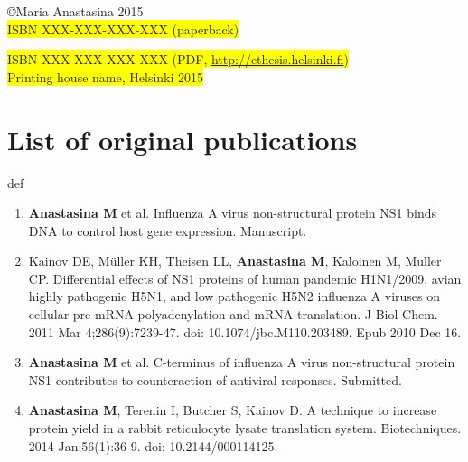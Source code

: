 \documentclass[a4paper,12pt]{article} %
\providecommand{\phantomsection}{def} %
\begin{document}
\vspace{2 cm}

\copyright Maria Anastasina 2015 \\


\fboxsep=0pt\colorbox{yellow}{ISBN XXX-XXX-XXX-XXX (paperback)}

\fboxsep=0pt\colorbox{yellow}{ISBN XXX-XXX-XXX-XXX (PDF, \url{http://ethesis.helsinki.fi})}\\

\fboxsep=0pt\colorbox{yellow}{Printing house name, Helsinki 2015}


\newpage
\thispagestyle{empty}
\tableofcontents


\newpage
\thispagestyle{empty}
\section*{List of original publications}
\phantomsection %

	\begin{enumerate}[I]

	\item \textbf{Anastasina M} et al. Influenza A virus non-structural protein NS1 binds DNA to control host gene expression. Manuscript. \label{DNA}
	
	\item 	Kainov DE, Müller KH, Theisen LL, \textbf{Anastasina M}, Kaloinen M, Muller CP. Differential effects of NS1 proteins of human pandemic H1N1/2009, avian highly pathogenic H5N1, and low pathogenic H5N2 influenza A viruses on cellular pre-mRNA polyadenylation and mRNA translation. J Biol Chem. 2011 Mar 4;286(9):7239-47. doi: 10.1074/jbc.M110.203489. Epub 2010 Dec 16. \label{Transl}
	
	\item \textbf{Anastasina M} et al. C-terminus of influenza A virus non-structural protein NS1 contributes to counteraction of antiviral responses. Submitted. \label{Cterm}
	
	\item \textbf{Anastasina M}, Terenin I, Butcher S, Kainov D. A technique to increase protein yield in a rabbit reticulocyte lysate translation system. Biotechniques. 2014 Jan;56(1):36-9. doi: 10.2144/000114125. \label{RRL}
	
\end{enumerate}
\end{document}
